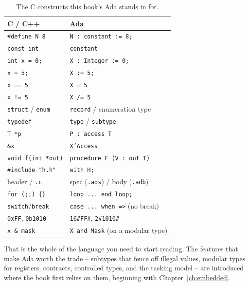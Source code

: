 \begin{table}[ht]
\centering
\begin{tabular}{@{}ll@{}}
\toprule
\textbf{C / C++} & \textbf{Ada} \\
\midrule
\texttt{\#define N 8}          & \texttt{N : constant := 8;} \\
\texttt{const int}             & \texttt{constant} \\
\texttt{int x = 0;}            & \texttt{X : Integer := 0;} \\
\texttt{x = 5;}                & \texttt{X := 5;} \\
\texttt{x == 5}                & \texttt{X = 5} \\
\texttt{x != 5}                & \texttt{X /= 5} \\
\texttt{struct} / \texttt{enum} & \texttt{record} / enumeration type \\
\texttt{typedef}              & \texttt{type} / \texttt{subtype} \\
\texttt{T *p}                 & \texttt{P : access T} \\
\texttt{\&x}                   & \texttt{X'Access} \\
\texttt{void f(int *out)}     & \texttt{procedure F (V : out T)} \\
\texttt{\#include "h.h"}       & \texttt{with H;} \\
header / \texttt{.c}          & spec (\texttt{.ads}) / body (\texttt{.adb}) \\
\texttt{for (;;) \{\}}         & \texttt{loop ... end loop;} \\
\texttt{switch}/\texttt{break} & \texttt{case ... when =>} (no break) \\
\texttt{0xFF}, \texttt{0b1010} & \texttt{16\#FF\#}, \texttt{2\#1010\#} \\
\texttt{x \& mask}            & \texttt{X and Mask} (on a modular type) \\
\bottomrule
\end{tabular}
\caption{The C constructs this book's Ada stands in for.}
\end{table}

That is the whole of the language you need to start reading. The features that make
Ada worth the trade -- subtypes that fence off illegal values, modular types for
registers, contracts, controlled types, and the tasking model -- are introduced
where the book first relies on them, beginning with Chapter~\ref{ch:embedded}.
